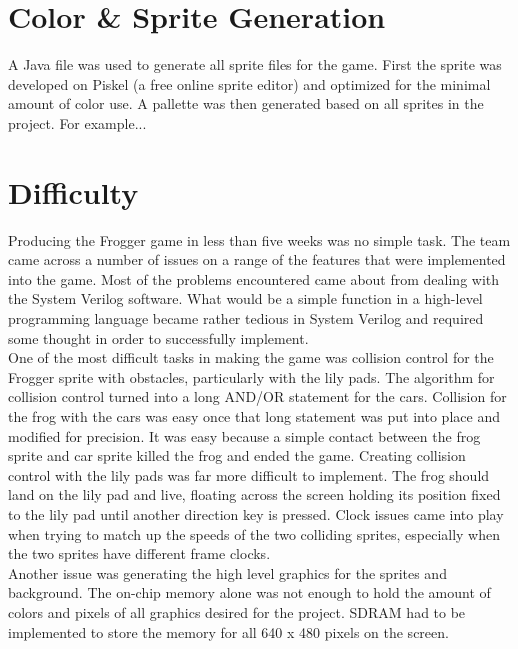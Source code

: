 \documentclass[journal, twocolumn, final,11pt,letterpaper]{IEEEtran}
\begin{document}
\section{Color \& Sprite Generation}
A Java file was used to generate all sprite files for the game. First the sprite was developed on Piskel (a free online sprite editor) and optimized for the minimal amount of color use. A pallette was then generated based on all sprites in the project. For example...
	
	
\section{ Difficulty}
Producing the Frogger game in less than five weeks was no simple task.  The team came across a number of issues on a range of the features that were implemented into the game.  Most of the problems encountered came about from dealing with the System Verilog software.  What would be a simple function in a high-level programming language became rather tedious in System Verilog and required some thought in order to successfully implement.  \\

One of the most difficult tasks in making the game was collision control for the Frogger sprite with obstacles, particularly with the lily pads.  The algorithm for collision control turned into a long AND/OR statement for the cars.  Collision for the frog with the cars was easy once that long statement was put into place and modified for precision.  It was easy because a simple contact between the frog sprite and car sprite killed the frog and ended the game.  Creating collision control with the lily pads was far more difficult to implement.  The frog should land on the lily pad and live, floating across the screen holding its position fixed to the lily pad until another direction key is pressed.  Clock issues came into play when trying to match up the speeds of the two colliding sprites, especially when the two sprites have different frame clocks.  \\

Another issue was generating the high level graphics for the sprites and background.  The on-chip memory alone was not enough to hold the amount of colors and pixels of all graphics desired for the project.  SDRAM had to be implemented to store the memory for all 640 x 480 pixels on the screen. \\
\end{document}
